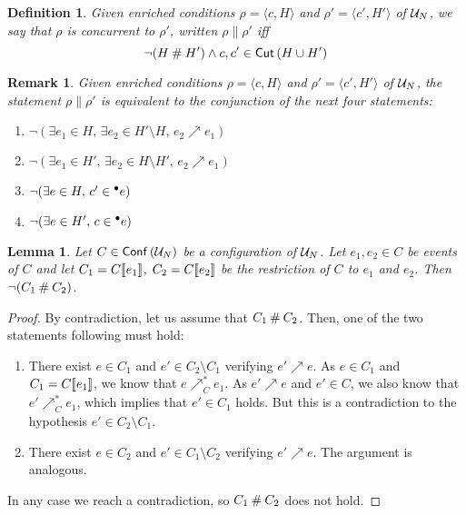 \documentclass[12pt,a4paper]{article}
\newtheorem{definition}[theorem]{Definition}
\newtheorem{lemma}[theorem]{Lemma}
\newtheorem{remark}[theorem]{Remark}
\newcommand{\conf}[1]{\ensuremath{\mathop{\mathsf{Conf}}{(#1)}}}
\newcommand{\confl}{\ensuremath\mathbin\#}
\begin{document}
\begin{definition}
Given enriched conditions $\rho = \langle c, H \rangle$ and $\rho' = \langle
c', H' \rangle$ of $\mathcal{U}_{N}$, we say that $\rho$ is \emph{concurrent} to
$\rho'$, written $\rho \parallel \rho'$ iff $$\lnot (H \confl H') \land c, c'
\in \cut{H \cup H'}$$
\end{definition}

\begin{remark}
\label{rmk:the.statement}
Given enriched conditions $\rho = \langle c, H \rangle$ and $\rho' = \langle
c', H' \rangle$ of $\mathcal{U}_{N}$, the statement $\rho \parallel \rho'$ is equivalent
to the conjunction of the next four statements:
\begin{enumerate}
\item $\lnot (\exists e_1 \in H,\, \exists e_2 \in H' \setminus H,\, e_2
\nearrow e_1)$
\item $\lnot (\exists e_1 \in H',\, \exists e_2 \in H \setminus H',\, e_2
\nearrow e_1)$
\item $\lnot (\exists e \in H,\, c' \in {}^\bullet e)$
\item $\lnot (\exists e \in H',\, c \in {}^\bullet e)$
\end{enumerate}
\end{remark}

\begin{lemma}
\label{lem:let.c}
Let $C \in \conf{\unf N}$ be a configuration of $\mathcal{U}_{N}$. Let $e_1, e_2 \in C$
be events of $C$ and let $C_1 = C [\![ e_1]\!]$, $C_2 = C [\![ e_2]\!]$ be the
restriction of $C$ to $e_1$ and $e_2$.  Then $\lnot (C_1 \confl C_2)$.
\end{lemma}

\begin{proof}
By contradiction, let us assume that $C_1 \confl C_2$.  Then, one of the two
statements following must hold:

\begin{enumerate}
\item There exist $e \in C_1$ and $e' \in C_2 \setminus C_1$ verifying $e'
\nearrow e$.  As $e \in C_1$ and $C_1 = C[\![ e_1]\!]$, we know that $e
\nearrow^*_C e_1$.  As $e' \nearrow e$ and $e' \in C$, we also know that $e'
\nearrow^*_C e_1$, which implies that $e' \in C_1$ holds.  But this is a
contradiction to the hypothesis $e' \in C_2 \setminus C_1$.

\item There exist $e \in C_2$ and $e' \in C_1 \setminus C_2$ verifying $e'
\nearrow e$.  The argument is analogous.
\end{enumerate}

In any case we reach a contradiction, so $C_1 \confl C_2$ does not hold.
\end{proof}
\end{document}
